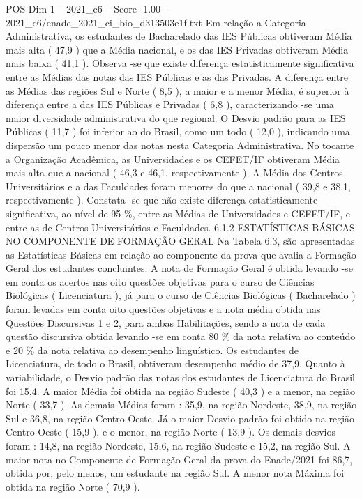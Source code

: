 \begin{textsample}{POS Dim 1 – 2021\_c6 – Score -1.00 – 2021\_c6/enade\_2021\_ci\_bio\_d313503e1f.txt}
Em relação a Categoria Administrativa, os estudantes de Bacharelado das IES Públicas obtiveram Média mais alta ( 47,9 ) que a Média nacional, e os das IES Privadas obtiveram Média mais baixa ( 41,1 ).
Observa -se que existe diferença estatisticamente significativa entre as Médias das notas das IES Públicas e as das Privadas.
A diferença entre as Médias das regiões Sul e Norte ( 8,5 ), a maior e a menor Média, é superior à diferença entre a das IES Públicas e Privadas ( 6,8 ), caracterizando -se uma maior diversidade administrativa do que regional.
O Desvio padrão para as IES Públicas ( 11,7 ) foi inferior ao do Brasil, como um todo ( 12,0 ), indicando uma dispersão um pouco menor das notas nesta Categoria Administrativa.
No tocante a Organização Acadêmica, as Universidades e os CEFET/IF obtiveram Média mais alta que a nacional ( 46,3 e 46,1, respectivamente ).
A Média dos Centros Universitários e a das Faculdades foram menores do que a nacional ( 39,8 e 38,1, respectivamente ).
Constata -se que não existe diferença estatisticamente significativa, ao nível de 95 \%, entre as Médias de Universidades e CEFET/IF, e entre as de Centros Universitários e Faculdades. 6.1.2 ESTATÍSTICAS BÁSICAS NO COMPONENTE DE FORMAÇÃO GERAL Na Tabela 6.3, são apresentadas as Estatísticas Básicas em relação ao componente da prova que avalia a Formação Geral dos estudantes concluintes.
A nota de Formação Geral é obtida levando -se em conta os acertos nas oito questões objetivas para o curso de Ciências Biológicas ( Licenciatura ), já para o curso de Ciências Biológicas ( Bacharelado ) foram levadas em conta oito questões objetivas e a nota média obtida nas Questões Discursivas 1 e 2, para ambas Habilitações, sendo a nota de cada questão discursiva obtida levando -se em conta 80 \% da nota relativa ao conteúdo e 20 \% da nota relativa ao desempenho linguístico.
Os estudantes de Licenciatura, de todo o Brasil, obtiveram desempenho médio de 37,9.
Quanto à variabilidade, o Desvio padrão das notas dos estudantes de Licenciatura do Brasil foi 15,4.
A maior Média foi obtida na região Sudeste ( 40,3 ) e a menor, na região Norte ( 33,7 ).
As demais Médias foram : 35,9, na região Nordeste, 38,9, na região Sul e 36,8, na região Centro-Oeste.
Já o maior Desvio padrão foi obtido na região Centro-Oeste ( 15,9 ), e o menor, na região Norte ( 13,9 ).
Os demais desvios foram : 14,8, na região Nordeste, 15,6, na região Sudeste e 15,2, na região Sul.
A maior nota no Componente de Formação Geral da prova do Enade/2021 foi 86,7, obtida por, pelo menos, um estudante na região Sul.
A menor nota Máxima foi obtida na região Norte ( 70,9 ).

\end{textsample}
